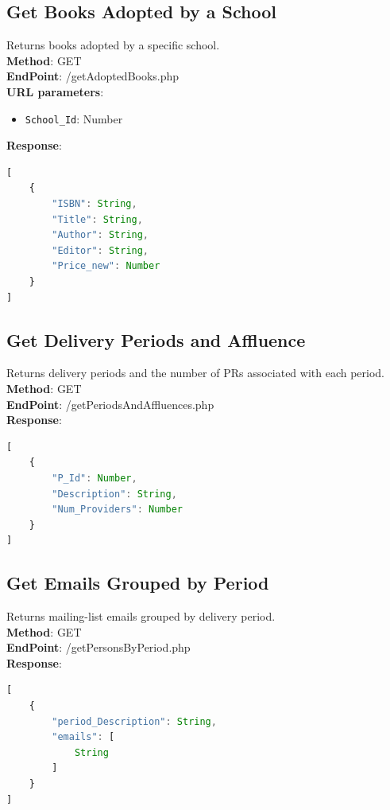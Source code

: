 \subsection{Get Books Adopted by a School}
Returns books adopted by a specific school.\\

\textbf{Method}: GET \\
\textbf{EndPoint}: /getAdoptedBooks.php \\

\textbf{URL parameters}:
\begin{itemize}
    \item \texttt{School\_Id}: Number
\end{itemize}

\textbf{Response}:
\begin{lstlisting}[language=JavaScript, basicstyle=\ttfamily]
[
    {
        "ISBN": String,
        "Title": String,
        "Author": String,
        "Editor": String,
        "Price_new": Number
    }
]
\end{lstlisting}

\subsection{Get Delivery Periods and Affluence}
Returns delivery periods and the number of PRs associated with each period.\\

\textbf{Method}: GET \\
\textbf{EndPoint}: /getPeriodsAndAffluences.php \\

\textbf{Response}:
\begin{lstlisting}[language=JavaScript, basicstyle=\ttfamily]
[
    {
        "P_Id": Number,
        "Description": String,
        "Num_Providers": Number
    }
]
\end{lstlisting}

\subsection{Get Emails Grouped by Period}
Returns mailing-list emails grouped by delivery period.\\

\textbf{Method}: GET \\
\textbf{EndPoint}: /getPersonsByPeriod.php \\

\textbf{Response}:
\begin{lstlisting}[language=JavaScript, basicstyle=\ttfamily]
[
    {
        "period_Description": String,
        "emails": [
            String
        ]
    }
]
\end{lstlisting}

